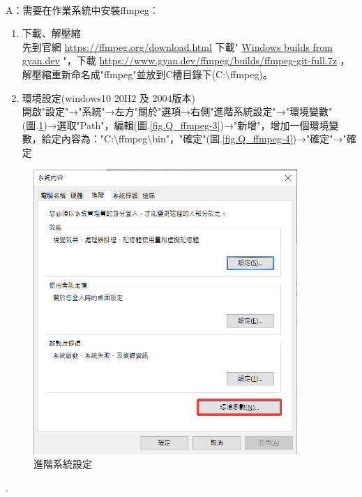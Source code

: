\documentclass[14pt,a4paper]{report}  %
\begin{document}
\\
A：需要在作業系統中安裝ffmpeg：
\begin{enumerate}
\item 下載、解壓縮\\
先到官網 \href{https://ffmpeg.org/download.html}{https://ffmpeg.org/download.html} 下載" \href{https://www.gyan.dev/ffmpeg/builds/}{Windows builds from gyan.dev} "，下載 \href{https://www.gyan.dev/ffmpeg/builds/ffmpeg-git-full.7z}{https://www.gyan.dev/ffmpeg/builds/ffmpeg-git-full.7z} ，解壓縮重新命名成"ffmpeg"並放到C槽目錄下(C:$\setminus$ffmpeg)。
\item 環境設定(windows10 20H2 及 2004版本)\\
開啟"設定"→"系統"→左方"關於"選項→右側"進階系統設定"→"環境變數"(圖.\ref{fig.Q_ffmpeg-2})→選取"Path"，編輯(圖.\ref{fig.Q_ffmpeg-3})→"新增"，增加一個環境變數，給定內容為："C:$\setminus$ffmpeg$\setminus$bin"，"確定"(圖.\ref{fig.Q_ffmpeg-4})→"確定"→"確定\\
\end{enumerate}
\begin{figure}[hbt!]
\begin{center}
\includegraphics[width=10cm]{Q_ffmpeg-2}
\caption{\Large 進階系統設定}
\label{fig.Q_ffmpeg-2}
\end{center}
\end{figure}
\fontsize{0.001pt}{1pt}\selectfont .\\ %
\end{document}
